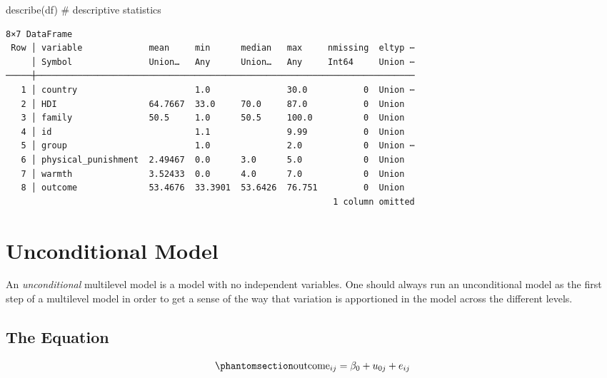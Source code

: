 \documentclass[
  letterpaper,
  DIV=11,
  numbers=noendperiod]{scrreprt}
\newenvironment{Shaded}{\begin{snugshade}}{\end{snugshade}}
\newcommand{\CommentTok}[1]{\textcolor[rgb]{0.37,0.37,0.37}{#1}}
\newcommand{\FunctionTok}[1]{\textcolor[rgb]{0.28,0.35,0.67}{#1}}
\newcommand{\NormalTok}[1]{\textcolor[rgb]{0.00,0.23,0.31}{#1}}
\begin{document}
\begin{Shaded}
\begin{Highlighting}[]

\FunctionTok{describe}\NormalTok{(df) }\CommentTok{\# descriptive statistics}
\end{Highlighting}
\end{Shaded}

\begin{verbatim}
8×7 DataFrame
 Row │ variable             mean     min      median   max     nmissing  eltyp ⋯
     │ Symbol               Union…   Any      Union…   Any     Int64     Union ⋯
─────┼──────────────────────────────────────────────────────────────────────────
   1 │ country                       1.0               30.0           0  Union ⋯
   2 │ HDI                  64.7667  33.0     70.0     87.0           0  Union
   3 │ family               50.5     1.0      50.5     100.0          0  Union
   4 │ id                            1.1               9.99           0  Union
   5 │ group                         1.0               2.0            0  Union ⋯
   6 │ physical_punishment  2.49467  0.0      3.0      5.0            0  Union
   7 │ warmth               3.52433  0.0      4.0      7.0            0  Union
   8 │ outcome              53.4676  33.3901  53.6426  76.751         0  Union
                                                                1 column omitted
\end{verbatim}


\chapter{Unconditional Model}\label{unconditional-model}

An \emph{unconditional} multilevel model is a model with no independent
variables. One should always run an unconditional model as the first
step of a multilevel model in order to get a sense of the way that
variation is apportioned in the model across the different levels.

\section{The Equation}\label{the-equation}

\begin{equation}\phantomsection\label{eq-MLMunconditional}{\text{outcome}_{ij}= \beta_0 + u_{0j} + e_{ij}}\end{equation}
\end{document}
